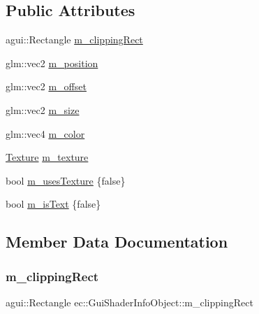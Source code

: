 \subsection*{Public Attributes}
\begin{DoxyCompactItemize}
\item 
agui\+::\+Rectangle \mbox{\hyperlink{structec_1_1_gui_shader_info_object_ab24686318cc8ad087ab9bc5340ed2039}{m\+\_\+clipping\+Rect}}
\item 
glm\+::vec2 \mbox{\hyperlink{structec_1_1_gui_shader_info_object_afff54f995320a1595bd59a68b98a8b4d}{m\+\_\+position}}
\item 
glm\+::vec2 \mbox{\hyperlink{structec_1_1_gui_shader_info_object_a5b5f81392dce6d0cbaf5d319a5b93475}{m\+\_\+offset}}
\item 
glm\+::vec2 \mbox{\hyperlink{structec_1_1_gui_shader_info_object_ac0d60eba17cc5202cb3a437ccec71926}{m\+\_\+size}}
\item 
glm\+::vec4 \mbox{\hyperlink{structec_1_1_gui_shader_info_object_adad3efd30731997e995a57b980c31bfb}{m\+\_\+color}}
\item 
\mbox{\hyperlink{classec_1_1_texture}{Texture}} \mbox{\hyperlink{structec_1_1_gui_shader_info_object_a80f6058638a7da161d3f30cdb771355c}{m\+\_\+texture}}
\item 
bool \mbox{\hyperlink{structec_1_1_gui_shader_info_object_af9f670fe1830664d40f9f9349be47ac5}{m\+\_\+uses\+Texture}} \{false\}
\item 
bool \mbox{\hyperlink{structec_1_1_gui_shader_info_object_aa306257232ebca60174628d3b13a9173}{m\+\_\+is\+Text}} \{false\}
\end{DoxyCompactItemize}


\subsection{Member Data Documentation}
\mbox{\label{structec_1_1_gui_shader_info_object_ab24686318cc8ad087ab9bc5340ed2039}} 
\subsubsection{\texorpdfstring{m\+\_\+clipping\+Rect}{m\_clippingRect}}
{\footnotesize\ttfamily agui\+::\+Rectangle ec\+::\+Gui\+Shader\+Info\+Object\+::m\+\_\+clipping\+Rect}

